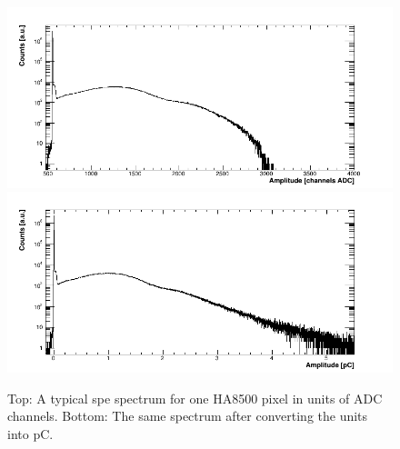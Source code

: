 \begin{figure}[hbt]
	\centering
	\includegraphics[width=\linewidth]{figures/CA7811_w1_g064_v1100_056_adc.png}
	\includegraphics[width=\linewidth]{figures/CA7811_w1_g064_v1100_056_pC.png}	
	\caption{Top: A typical spe spectrum for one HA8500 pixel in units of ADC channels. Bottom: The same spectrum after converting the units into pC.}
	\label{fig:H8500calib}
\end{figure}